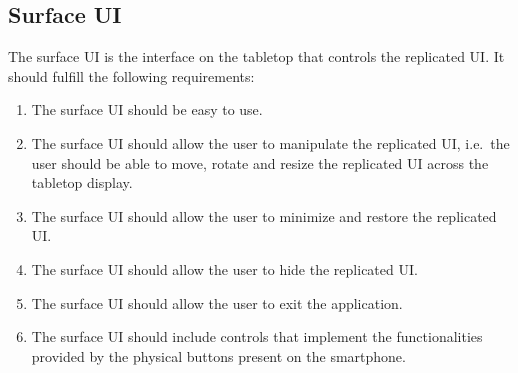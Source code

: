 
\subsection{Surface UI}

The surface UI is the interface on the tabletop that controls the replicated UI.
It should fulfill the following requirements:

\label{RD}
\begin{enumerate}[{RD}-1]
\item The surface UI should be easy to use.
\item The surface UI should allow the user to manipulate the replicated UI, i.e.\ the user should be able to move, rotate and resize the replicated UI across the tabletop display.
\item The surface UI should allow the user to minimize and restore the replicated UI.
\item The surface UI should allow the user to hide the replicated UI.
\item The surface UI should allow the user to exit the application.
\item The surface UI should include controls that implement the functionalities provided by the physical buttons present on the smartphone.
\end{enumerate}


%
%
%

